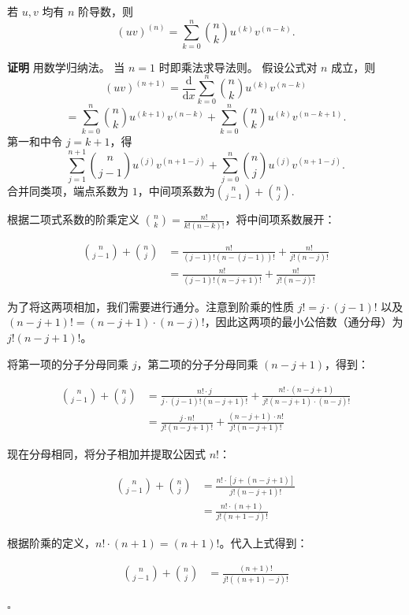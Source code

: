 \documentclass[fontset=fandol]{ctexart}
\newenvironment{extra}{\begin{mdframed}[style=extrastyle, frametitle={* 选读内容（不要求掌握）}]}{\end{mdframed}}
\newenvironment{proofdetail}{\par\noindent\textbf{证明}\quad}{\hfill$\square$\par\vspace{0.8em}}
\newcommand{\dd}{\mathrm{d}}
\begin{document}
\begin{extra}
\begin{theorem}[莱布尼茨公式]
若 $u,v$ 均有 $n$ 阶导数，则
\[
(uv)^{(n)}=\sum_{k=0}^{n}\binom{n}{k}u^{(k)}v^{(n-k)}.
\]
\end{theorem}
\begin{proofdetail}
用数学归纳法。 当 $n=1$ 时即乘法求导法则。 假设公式对 $n$ 成立，则
\[
(uv)^{(n+1)}
=\frac{\dd}{\dd x}\sum_{k=0}^{n}\binom{n}{k}u^{(k)}v^{(n-k)}
\]
\[
=\sum_{k=0}^{n}\binom{n}{k}u^{(k+1)}v^{(n-k)}
+\sum_{k=0}^{n}\binom{n}{k}u^{(k)}v^{(n-k+1)}.
\]
第一和中令 $j=k+1$，得
\[
\sum_{j=1}^{n+1}\binom{n}{j-1}u^{(j)}v^{(n+1-j)}
+\sum_{j=0}^{n}\binom{n}{j}u^{(j)}v^{(n+1-j)}.
\]
合并同类项，端点系数为 $1$，中间项系数为$\binom{n}{j-1}+\binom{n}{j}$.



根据二项式系数的阶乘定义 $\binom{n}{k} = \frac{n!}{k!(n-k)!}$，将中间项系数展开：

\begin{align*}
	\binom{n}{j-1} + \binom{n}{j} &= \frac{n!}{(j-1)!(n - (j-1))!} + \frac{n!}{j!(n-j)!} \\
	&= \frac{n!}{(j-1)!(n-j+1)!} + \frac{n!}{j!(n-j)!}
\end{align*}

为了将这两项相加，我们需要进行通分。注意到阶乘的性质 $j! = j \cdot (j-1)!$ 以及 $(n-j+1)! = (n-j+1) \cdot (n-j)!$，因此这两项的最小公倍数（通分母）为 $j!(n-j+1)!$。

将第一项的分子分母同乘 $j$，第二项的分子分母同乘 $(n-j+1)$，得到：

\begin{align*}
	\binom{n}{j-1} + \binom{n}{j} &= \frac{n! \cdot j}{j \cdot (j-1)!(n-j+1)!} + \frac{n! \cdot (n-j+1)}{j!(n-j+1) \cdot (n-j)!} \\
	&= \frac{j \cdot n!}{j!(n-j+1)!} + \frac{(n-j+1) \cdot n!}{j!(n-j+1)!}
\end{align*}

现在分母相同，将分子相加并提取公因式 $n!$：

\begin{align*}
	\binom{n}{j-1} + \binom{n}{j} &= \frac{n! \cdot [j + (n-j+1)]}{j!(n-j+1)!} \\
	&= \frac{n! \cdot (n+1)}{j!(n+1-j)!}
\end{align*}

根据阶乘的定义，$n! \cdot (n+1) = (n+1)!$。代入上式得到：

\begin{align*}
	\binom{n}{j-1} + \binom{n}{j} &= \frac{(n+1)!}{j!((n+1)-j)!}
\end{align*}


\end{proofdetail}
\end{extra}
\end{document}
